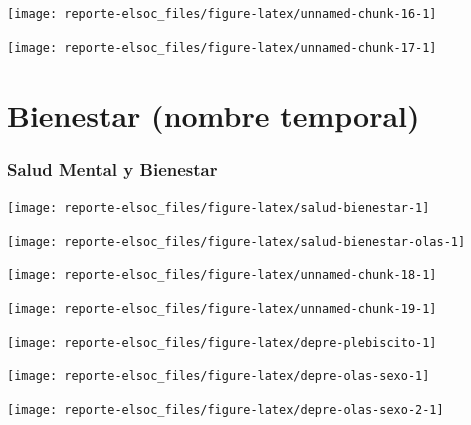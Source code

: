 \documentclass[
  12pt,
]{book}
\begin{document}
\begin{center}\texttt{[image: reporte-elsoc\_files/figure-latex/unnamed-chunk-16-1]} \end{center}

\begin{center}\texttt{[image: reporte-elsoc\_files/figure-latex/unnamed-chunk-17-1]} \end{center}

\hypertarget{bienestar-nombre-temporal}{%
\chapter{Bienestar (nombre temporal)}\label{bienestar-nombre-temporal}}

\hypertarget{salud-mental-y-bienestar}{%
\subsection{Salud Mental y Bienestar}\label{salud-mental-y-bienestar}}

\begin{center}\texttt{[image: reporte-elsoc\_files/figure-latex/salud-bienestar-1]} \end{center}

\begin{center}\texttt{[image: reporte-elsoc\_files/figure-latex/salud-bienestar-olas-1]} \end{center}

\begin{center}\texttt{[image: reporte-elsoc\_files/figure-latex/unnamed-chunk-18-1]} \end{center}

\begin{center}\texttt{[image: reporte-elsoc\_files/figure-latex/unnamed-chunk-19-1]} \end{center}

\begin{center}\texttt{[image: reporte-elsoc\_files/figure-latex/depre-plebiscito-1]} \end{center}

\begin{center}\texttt{[image: reporte-elsoc\_files/figure-latex/depre-olas-sexo-1]} \end{center}

\begin{center}\texttt{[image: reporte-elsoc\_files/figure-latex/depre-olas-sexo-2-1]} \end{center}
\end{document}

